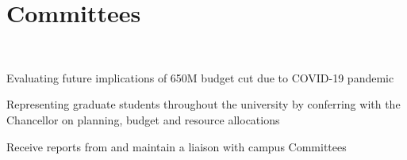 \documentclass[letterpaper]{deedy-resume-openfont}
\begin{document}
\begin{minipage}[t]{0.67\textwidth}
\vspace{-0.4cm}
\section{Committees}
\vspace{-0.05cm}
  \\
 \begin{tightemize}
        \item Evaluating future implications of 650M budget cut due to COVID-19 pandemic
        \item Representing graduate students throughout the university by conferring with the Chancellor on planning, budget and resource allocations
        \item Receive reports from and maintain a liaison with campus Committees
    \end{tightemize}
\sectionsep

\end{minipage} 
\end{document}
